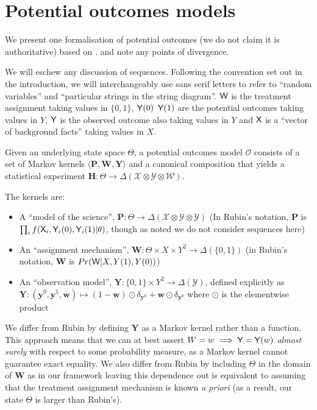 
\section{Potential outcomes models}\label{sec:counterfactuals}

We present one formalisation of potential outcomes (we do not claim it is authoritative) based on \cite{rubin_causal_2005}, and note any points of divergence. 

We will eschew any discussion of sequences. Following the convention set out in the introduction, we will interchangeably use sans serif letters to refer to ``random variables'' and ``particular strings in the string diagram''. $\mathsf{W}$ is the treatment assignment taking values in $\{0,1\}$, $\mathsf{Y}(0)$ $\mathsf{Y}(1)$ are the potential outcomes taking values in $Y$, $\mathsf{Y}$ is the observed outcome also taking values in $Y$ and $\mathsf{X}$ is a ``vector of background facts'' taking values in $X$.

Given an underlying state space $\Theta$, a potential outcomes model $\mathscr{O}$ consists of a set of Markov kernels $\langle \mathbf{P}, \mathbf{W}, \mathbf{Y} \rangle$ and a canonical composition that yields a statistical experiment $\mathbf{H}:\Theta\to \Delta(\mathcal{X}\otimes\mathcal{Y}\otimes \mathcal{W})$. 

The kernels are:
\begin{itemize}
\item A ``model of the science'', $\mathbf{P}:\Theta \to \Delta(\mathcal{X}\otimes\mathcal{Y}\otimes\mathcal{Y})$ (In Rubin's notation, $\mathbf{P}$ is $\prod_i f(\mathsf{X}_i,\mathsf{Y}_i(0),\mathsf{Y}_i(1)|\theta)$, though as noted we do not consider sequences here)
\item An ``assignment mechanism'', $\mathbf{W}:\Theta\times X\times Y^2 \to \Delta(\{0,1\})$ (in Rubin's notation, $\mathbf{W}$ is $Pr(\mathsf{W}|X,Y(1),Y(0))$)
\item An ``observation model'', $\mathbf{Y}:\{0,1\}\times Y^2\to \Delta(\mathcal{Y})$, defined explicitly as $\mathbf{Y}:(\mathbf{y}^0,\mathbf{y}^1,\mathbf{w})\mapsto (1-\mathbf{w}) \odot \delta_{\mathbf{y}^0} + \mathbf{w} \odot \delta_{\mathbf{y}^0}$ where $\odot$ is the elementwise product
\end{itemize}

We differ from Rubin by defining $\mathbf{Y}$ as a Markov kernel rather than a function. This approach means that we can at best assert $W=w\implies \mathsf{Y}=\mathsf{Y}(w)$ \emph{almost surely} with respect to some probability measure, as a Markov kernel cannot guarantee exact equality. We also differ from Rubin by including $\Theta$ in the domain of $\mathbf{W}$ as in our framework leaving this dependence out is equivalent to assuming that the treatment assignment mechanism is known \emph{a priori} (as a result, our state $\Theta$ is larger than Rubin's).

